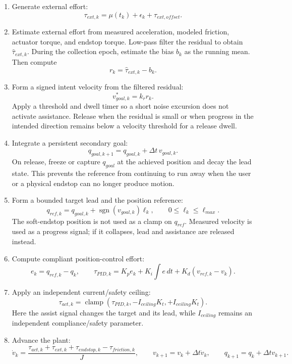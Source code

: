 \documentclass[11pt]{article}
\begin{document}
\begin{enumerate}[leftmargin=*]
  \item Generate external effort:
  \[
    \tau_{ext,k} = \mu(t_k) + \epsilon_k + \tau_{ext,offset}.
  \]
  \item Estimate external effort from measured acceleration, modeled friction,
  actuator torque, and endstop torque. Low-pass filter the residual to obtain
  $\hat{\tau}_{ext,k}$. During the collection epoch, estimate the bias $b_k$ as
  the running mean. Then compute
  \[
    r_k = \hat{\tau}_{ext,k} - b_k.
  \]
  \item Form a signed intent velocity from the filtered residual:
  \[
    v_{goal,k}^{*} = k_r r_k.
  \]
  Apply a threshold and dwell timer so a short noise excursion does not activate
  assistance. Release when the residual is small or when progress in the
  intended direction remains below a velocity threshold for a release dwell.
  \item Integrate a persistent secondary goal:
  \[
    q_{goal,k+1} = q_{goal,k} + \Delta t\,v_{goal,k}.
  \]
  On release, freeze or capture $q_{goal}$ at the achieved position and decay
  the lead state. This prevents the reference from continuing to run away when
  the user or a physical endstop can no longer produce motion.
  \item Form a bounded target lead and the position reference:
  \[
    q_{ref,k} = q_{goal,k} + \operatorname{sgn}(v_{goal,k})\ell_k,
    \qquad 0 \leq \ell_k \leq \ell_{max}.
  \]
  The soft-endstop position is not used as a clamp on $q_{ref}$. Measured
  velocity is used as a progress signal; if it collapses, lead and assistance
  are released instead.
  \item Compute compliant position-control effort:
  \[
    e_k = q_{ref,k} - q_k,
    \qquad
    \tau_{PID,k} = K_p e_k + K_i\!\int e\,dt
                   + K_d(v_{ref,k}-v_k).
  \]
  \item Apply an independent current/safety ceiling:
  \[
    \tau_{act,k} = \operatorname{clamp}\left(\tau_{PID,k},
      -I_{ceiling}K_t,+I_{ceiling}K_t\right).
  \]
  Here the assist signal changes the target and its lead, while $I_{ceiling}$
  remains an independent compliance/safety parameter.
  \item Advance the plant:
  \[
    \dot v_k = \frac{\tau_{act,k}+\tau_{ext,k}+\tau_{endstop,k}
      -\tau_{friction,k}}{J},
    \qquad
    v_{k+1}=v_k+\Delta t\dot v_k,
    \qquad
    q_{k+1}=q_k+\Delta t v_{k+1}.
  \]
\end{enumerate}
\end{document}
